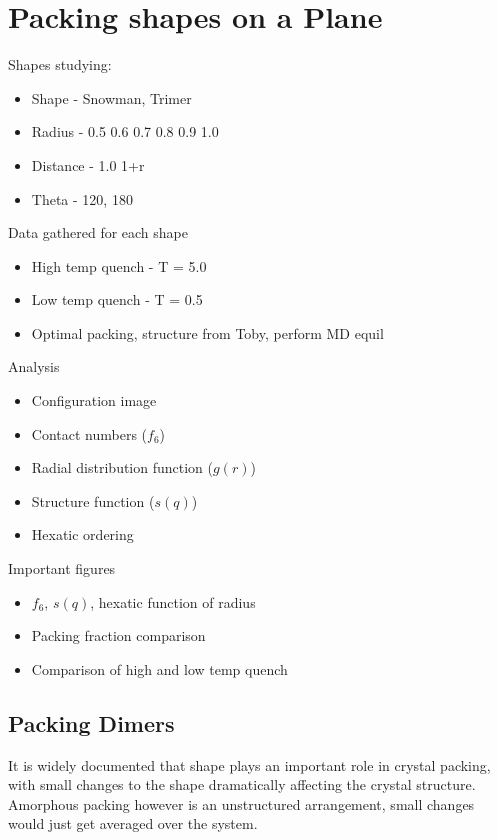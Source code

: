 \chapter{Packing shapes on a Plane}

Shapes studying:
\begin{itemize}
    \item Shape - Snowman, Trimer
    \item Radius - 0.5 0.6 0.7 0.8 0.9 1.0
    \item Distance - 1.0 1+r
    \item Theta - 120, 180
\end{itemize}

Data gathered for each shape
\begin{itemize}
    \item High temp quench - T = 5.0
    \item Low temp quench - T = 0.5
    \item Optimal packing, structure from Toby, perform MD equil
\end{itemize}

Analysis
\begin{itemize}
    \item Configuration image
    \item Contact numbers ($f_6$)
    \item Radial distribution function ($g(r)$)
    \item Structure function ($s(q)$)
    \item Hexatic ordering 
\end{itemize}

Important figures
\begin{itemize}
    \item $f_6$, $s(q)$, hexatic function of radius
    \item Packing fraction comparison
    \item Comparison of high and low temp quench
\end{itemize}

\section{Packing Dimers}

It is widely documented that shape plays an important role in crystal packing, with small changes to the shape dramatically affecting the crystal structure. Amorphous packing however is an unstructured arrangement, small changes would just get averaged over the system.


